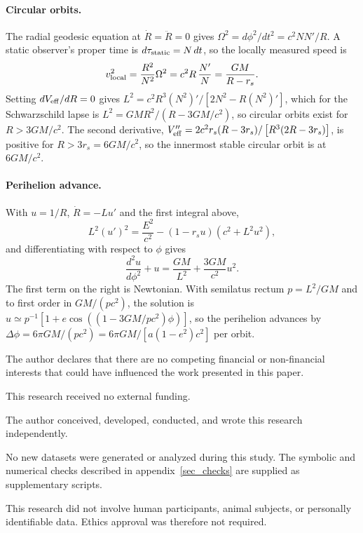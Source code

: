\documentclass[pdflatex,sn-mathphys-num]{sn-jnl}%
\theoremstyle{thmstyleone}%
\theoremstyle{thmstyletwo}%
\theoremstyle{thmstylethree}%
\begin{document}
\begin{appendices}
\paragraph{Circular orbits.} The radial geodesic equation at $\dot R=\ddot R=0$ gives $\Omega^2=d\phi^2/dt^2=c^2NN'/R$. A static observer's proper time is $d\tau_{\rm static}=N\,dt$, so the locally measured speed is
\begin{equation}
    v_{\rm local}^2=\frac{R^2}{N^2}\Omega^2=c^2R\,\frac{N'}{N}=\frac{GM}{R-r_s}.
\end{equation}
Setting $dV_{\rm eff}/dR=0$ gives $L^2=c^2R^3\left(N^2\right)'/\left[2N^2-R\left(N^2\right)'\right]$, which for the Schwarzschild lapse is $L^2=GMR^2/(R-3GM/c^2)$, so circular orbits exist for $R>3GM/c^2$. The second derivative, $V_{\rm eff}''=2c^2r_s(R-3r_s)/\left[R^3(2R-3r_s)\right]$, is positive for $R>3r_s=6GM/c^2$, so the innermost stable circular orbit is at $6GM/c^2$.
\paragraph{Perihelion advance.} With $u=1/R$, $\dot R=-Lu'$ and the first integral above,
\begin{equation}
    L^2\left(u'\right)^2=\frac{E^2}{c^2}-\left(1-r_su\right)\left(c^2+L^2u^2\right),
\end{equation}
and differentiating with respect to $\phi$ gives
\begin{equation}
    \frac{d^2u}{d\phi^2}+u=\frac{GM}{L^2}+\frac{3GM}{c^2}u^2 .
\end{equation}
The first term on the right is Newtonian. With semilatus rectum $p=L^2/GM$ and to first order in $GM/(pc^2)$, the solution is $u\simeq p^{-1}\left[1+e\cos\left((1-3GM/pc^2)\phi\right)\right]$, so the perihelion advances by $\Delta\phi=6\pi GM/(pc^2)=6\pi GM/\left[a(1-e^2)c^2\right]$ per orbit.

\end{appendices}

The author declares that there are no competing financial or non-financial interests that could have influenced the work presented in this paper.

This research received no external funding.

The author conceived, developed, conducted, and wrote this research independently.

No new datasets were generated or analyzed during this study. The symbolic and numerical checks described in appendix~\ref{sec_checks} are supplied as supplementary scripts.

This research did not involve human participants, animal subjects, or personally identifiable data. Ethics approval was therefore not required.

\end{document}
